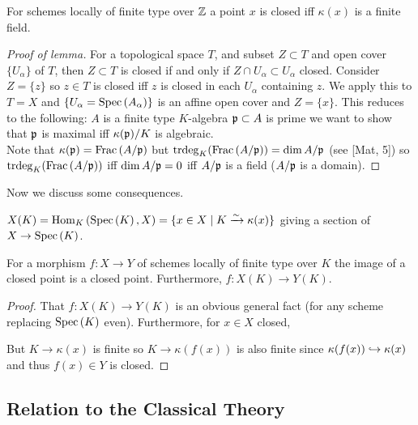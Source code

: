\documentclass[12pt]{article}
\begin{document}
\begin{rmk}
For schemes locally of finite type over $\mathbb{Z}$ a point $x$ is closed iff $\kappa(x)$ is a finite field.
\end{rmk}

\begin{proof}[Proof of lemma]
For a topological space $T$, and subset $Z \subset T$ and open cover $\{U_\alpha\}$ of $T$, then $Z \subset T$ is closed if and only if $Z \cap U_\alpha \subset U_\alpha$ closed. Consider $Z = \{ z \}$ so $z \in T$ is closed iff $z$ is closed in each $U_\alpha$ containing $z$. We apply this to $T = X$ and $\{ U_\alpha = \mathrm{Spec}\left( A_\alpha \right) \}$ is an affine open cover and $Z = \{ x \}$. This reduces to the following: $A$ is a finite type $K$-algebra $\mathfrak{p} \subset A$ is prime we want to show that $\mathfrak{p}$ is maximal iff $\kappa(\mathfrak{p}) / K$ is algebraic. 
\bigskip\\
Note that $\kappa(\mathfrak{p}) = \mathrm{Frac}\left(A / \mathfrak{p}\right)$ but $\mathrm{trdeg}_{K}(\mathrm{Frac}\left(A/\mathfrak{p}\right)) = \dim{A/\mathfrak{p}}$ (see [Mat, 5]) so $\mathrm{trdeg}_{K}(\mathrm{Frac}\left(A/\mathfrak{p}\right))$ iff $\dim{A/\mathfrak{p}} = 0$ iff $A / \mathfrak{p}$ is a field ($A/\mathfrak{p}$ is a domain).
\end{proof}
\noindent
Now we discuss some consequences. 

\begin{defn}
$X(K) = \mathrm{Hom}_{K} \left( \mathrm{Spec}\left( K \right), X \right) = \{ x \in X \mid K \xrightarrow{\sim} \kappa(x) \}$ giving a section of $X \to \mathrm{Spec}\left( K \right)$.
\end{defn}

\begin{lemma}
For a morphism $f : X \to Y$ of schemes locally of finite type over $K$ the image of a closed point is a closed point. Furthermore, $f : X(K) \to Y(K)$.
\end{lemma}

\begin{proof}
That $f : X(K) \to Y(K)$ is an obvious general fact (for any scheme replacing $\mathrm{Spec}\left( K \right)$ even). Furthermore, for $x \in X$ closed,
\begin{center}
\end{center}
But $K \to \kappa(x)$ is finite so $K \to \kappa(f(x))$ is also finite since $\kappa(f(x)) \hookrightarrow \kappa(x)$ and thus $f(x) \in Y$ is closed.
\end{proof}

\subsection{Relation to the Classical Theory}
\end{document}
